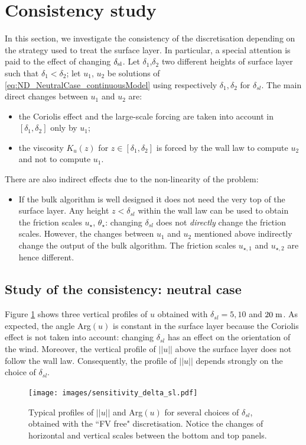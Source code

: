 \section{Consistency study}
\label{sec:ND_Consistency}
In this section, we investigate the consistency of the
discretisation depending on the strategy used to treat the
surface layer. In particular, a special attention is paid to
the effect of changing $\delta_{\rm sl}$.
Let $\delta_1$,$\delta_2$ two
different heights of surface layer
such that $\delta_1 < \delta_2$;
let $u_1$, $u_2$ be solutions of 
\eqref{eq:ND_NeutralCase_continuousModel} using
respectively $\delta_1, \delta_2$ for $\delta_{sl}$.
The main direct changes between $u_1$ and $u_2$ are:
\begin{itemize}
\item the Coriolis effect and the large-scale forcing are
taken into account in $[\delta_{1}, \delta_{2}]$
		only by $u_1$;
\item the viscosity $K_u(z)$ for $z \in [\delta_{1}, \delta_{2}]$
	is forced by the wall law to compute $u_2$
		and not to compute $u_1$.
\end{itemize}
There are also indirect effects due to the non-linearity of the
problem:
\begin{itemize}
	\item If the bulk algorithm is well designed it does not
		need the very top of the surface layer. Any height
		$z<\delta_{sl}$ within the wall law can be used
		to obtain the friction scales $u_\star$,
		$\theta_\star$: changing $\delta_{sl}$ does
		not \textit{directly} change the friction scales.
		However, the changes between $u_1$ and $u_2$ mentioned
		above indirectly change the output of the
		bulk algorithm.
		The friction scales $u_{\star, 1}$ and $u_{\star, 2}$
		are hence different.
\end{itemize}
\subsection{Study of the consistency: neutral case}
Figure \ref{fig:ND_Consistency_sensitivity_delta_sl} shows
three vertical profiles of $u$ obtained with
$\delta_{sl} = 5, 10$ and $20 \; {\rm m}$.
As expected, the angle Arg$(u)$
is constant in the surface layer because
the Coriolis effect is not taken into
account: changing $\delta_{sl}$
has an effect on the orientation of the wind.
Moreover, the vertical profile of $||u||$ above the
surface layer does not follow the wall law.
Consequently, the profile of $||u||$ depends strongly
on the choice of $\delta_{sl}$.
%
\begin{figure}
	\centering
\texttt{[image: images/sensitivity\_delta\_sl.pdf]}
	\caption{Typical profiles of $||u||$ and Arg$(u)$ for several
	choices of $\delta_{sl}$, obtained with the ``FV free"
	discretisation. Notice the changes of horizontal
	and vertical scales between the bottom and top panels.}
	\label{fig:ND_Consistency_sensitivity_delta_sl}
\end{figure}

